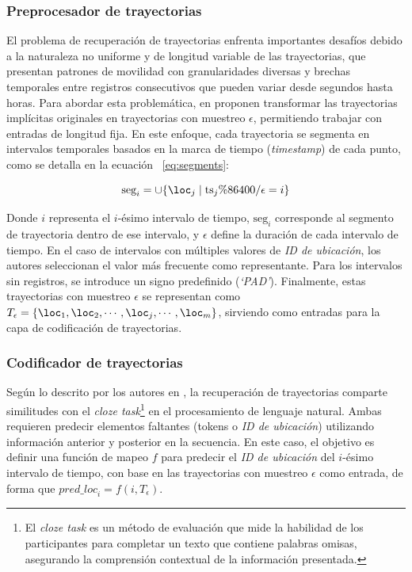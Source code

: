 \subsubsection{Preprocesador de trayectorias}

El problema de recuperación de trayectorias enfrenta importantes desafíos debido a la naturaleza no uniforme y de longitud variable de las trayectorias, que presentan patrones de movilidad con granularidades diversas y brechas temporales entre registros consecutivos que pueden variar desde segundos hasta horas. Para abordar esta problemática, en \cite{si2023trajbert} proponen transformar las trayectorias implícitas originales en trayectorias con muestreo $\epsilon$, permitiendo trabajar con entradas de longitud fija. En este enfoque, cada trayectoria se segmenta en intervalos temporales basados en la marca de tiempo (\textit{timestamp}) de cada punto, como se detalla en la ecuación ~\ref{eq:segments}:

\begin{equation}
\text{seg}_i = \cup \{ \loc_j \mid \text{ts}_j \% 86400 / \epsilon = i \}
\label{eq:segments}
\end{equation}

Donde $i$ representa el $i$-ésimo intervalo de tiempo, $\text{seg}_i$ corresponde al segmento de trayectoria dentro de ese intervalo, y $\epsilon$ define la duración de cada intervalo de tiempo. En el caso de intervalos con múltiples valores de \textit{ID de ubicación}, los autores seleccionan el valor más frecuente como representante. Para los intervalos sin registros, se introduce un signo predefinido (\textit{‘PAD’}). Finalmente, estas trayectorias con muestreo $\epsilon$ se representan como $T_\epsilon = \{\loc_1, \loc_2, \cdots, \loc_j, \cdots, \loc_m\}$, sirviendo como entradas para la capa de codificación de trayectorias.

\subsubsection{Codificador de trayectorias}

Según lo descrito por los autores en \cite{si2023trajbert}, la recuperación de trayectorias comparte similitudes con el \textit{cloze task}\footnote{El \textit{cloze task} es un método de evaluación que mide la habilidad de los participantes para completar un texto que contiene palabras omisas, asegurando la comprensión contextual de la información presentada.} en el procesamiento de lenguaje natural. Ambas requieren predecir elementos faltantes (tokens o \textit{ID de ubicación}) utilizando información anterior y posterior en la secuencia. En este caso, el objetivo es definir una función de mapeo $f$ para predecir el \textit{ID de ubicación} del $i$-ésimo intervalo de tiempo, con base en las trayectorias con muestreo $\epsilon$ como entrada, de forma que ${pred\_loc}_i = f(i, T_\epsilon)$.

